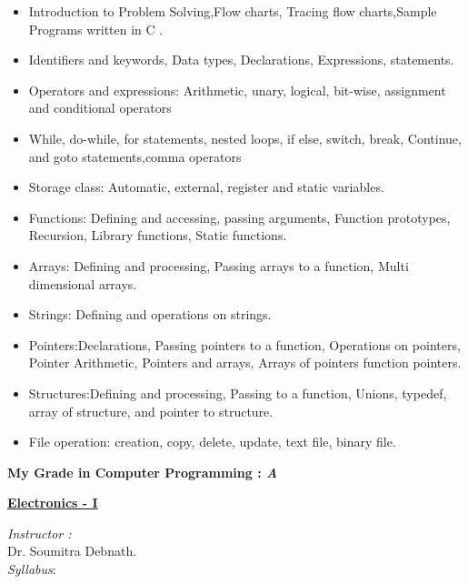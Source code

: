 \documentclass{report}
\begin{document}
\begin{itemize}
\item Introduction to Problem Solving,Flow charts, Tracing flow charts,Sample Programs written in C .
\item Identifiers and keywords, Data types, Declarations, Expressions, statements. 
\item Operators and expressions: Arithmetic, unary, logical, bit-wise, assignment and conditional operators
\item While, do-while, for statements, nested loops, if else, switch, break, Continue, and goto statements,comma operators 
\item Storage class: Automatic, external, register and static variables. 
\item Functions: Defining and accessing, passing arguments, Function prototypes, Recursion, Library 
functions, Static functions.
\item Arrays: Defining and processing, Passing arrays to a function, Multi dimensional arrays. 
\item Strings: Defining and operations on strings. 
\item Pointers:Declarations, Passing pointers  to a function, Operations on  pointers, Pointer Arithmetic, 
Pointers and arrays, Arrays of pointers function pointers. 
\item Structures:Defining and processing, Passing to a function,  Unions, typedef, array of structure, and 
pointer to structure. 
\item File operation: creation, copy, delete, update, text file, binary file. 
\end{itemize}
\Large{\bf My Grade in Computer Programming : \emph{A}}
\pagebreak
\begin{center}\huge{\bf \underline{Electronics - I}}\end{center}\vspace{.3in}
\large \emph{Instructor :}\vspace{.1in}\\
\hspace*{.1in} Dr. Soumitra Debnath.\vspace{.1in}\\
\emph{Syllabus}:\vspace{.05in}
\end{document}
